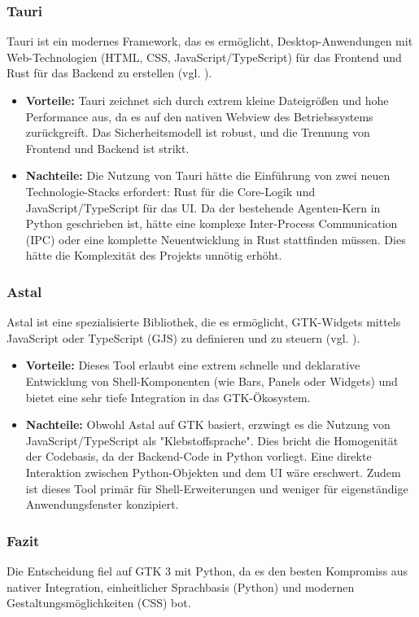 \subsubsection{Tauri}
Tauri ist ein modernes Framework, das es ermöglicht, Desktop-Anwendungen mit Web-Technologien (HTML, CSS, JavaScript/TypeScript) für das Frontend und Rust für das Backend zu erstellen (vgl. \cite{tauri}).
\begin{itemize}
	\item \textbf{Vorteile:} Tauri zeichnet sich durch extrem kleine Dateigrößen und hohe Performance aus, da es auf den nativen Webview des Betriebssystems zurückgreift. Das Sicherheitsmodell ist robust, und die Trennung von Frontend und Backend ist strikt.
	\item \textbf{Nachteile:} Die Nutzung von Tauri hätte die Einführung von zwei neuen Technologie-Stacks erfordert: Rust für die Core-Logik und JavaScript/TypeScript für das UI. Da der bestehende Agenten-Kern in Python geschrieben ist, hätte eine komplexe Inter-Process Communication (IPC) oder eine komplette Neuentwicklung in Rust stattfinden müssen. Dies hätte die Komplexität des Projekts unnötig erhöht.
\end{itemize}

\subsubsection{Astal}
Astal ist eine spezialisierte Bibliothek, die es ermöglicht, GTK-Widgets mittels JavaScript oder TypeScript (GJS) zu definieren und zu steuern (vgl. \cite{astal}).
\begin{itemize}
	\item \textbf{Vorteile:} Dieses Tool erlaubt eine extrem schnelle und deklarative Entwicklung von Shell-Komponenten (wie Bars, Panels oder Widgets) und bietet eine sehr tiefe Integration in das GTK-Ökosystem.
	\item \textbf{Nachteile:} Obwohl Astal auf GTK basiert, erzwingt es die Nutzung von JavaScript/TypeScript als "Klebstoffsprache". Dies bricht die Homogenität der Codebasis, da der Backend-Code in Python vorliegt. Eine direkte Interaktion zwischen Python-Objekten und dem UI wäre erschwert. Zudem ist dieses Tool primär für Shell-Erweiterungen und weniger für eigenständige Anwendungsfenster konzipiert.
\end{itemize}

\subsubsection{Fazit} Die Entscheidung fiel auf GTK 3 mit Python, da es den besten Kompromiss aus nativer Integration, einheitlicher Sprachbasis (Python) und modernen Gestaltungsmöglichkeiten (CSS) bot.


